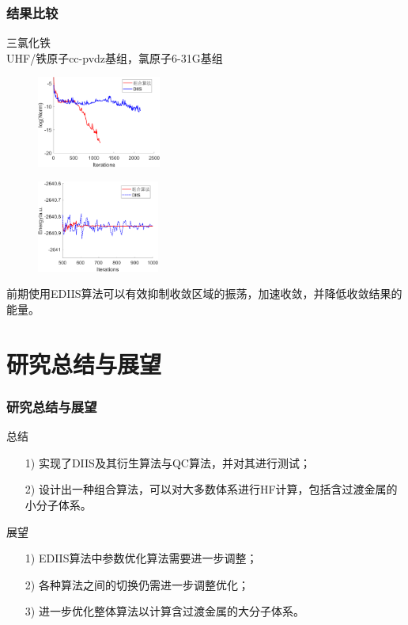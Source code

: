 \documentclass[10pt,aspectratio=43,mathserif,UTF8]{beamer}
\begin{document}
\begin{frame}
	\frametitle{结果比较}
	三氯化铁\\
	UHF/铁原子cc-pvdz基组，氯原子6-31G基组

	\begin{figure}[ht!]
		\centering
		\begin{minipage}{0.4\linewidth}
			\centering
			\includegraphics[height=3cm]{figure/FeCl3/NORM2.png}
			\label{fig:FeCl3:E}
		\end{minipage}
		\begin{minipage}{0.4\linewidth}
			\centering
			\includegraphics[height=3cm]{figure/FeCl3/FD6.png}
			\label{fig:FeCl3:FD}
		\end{minipage}
	\end{figure}
	前期使用EDIIS算法可以有效抑制收敛区域的振荡，加速收敛，并降低收敛结果的能量。
\end{frame}

\section{研究总结与展望}

\begin{frame}
	\frametitle{研究总结与展望}
	总结
	\begin{itemize}
		\item[1)]
		 实现了DIIS及其衍生算法与QC算法，并对其进行测试；
		\item[2)] 
		 设计出一种组合算法，可以对大多数体系进行HF计算，包括含过渡金属的小分子体系。
	\end{itemize}
	
	展望
	\begin{itemize}
		\item [1)]
		EDIIS算法中参数优化算法需要进一步调整；
		\item [2)]
		各种算法之间的切换仍需进一步调整优化；
		\item [3)]
		进一步优化整体算法以计算含过渡金属的大分子体系。
	\end{itemize}
\end{frame}
\end{document}
